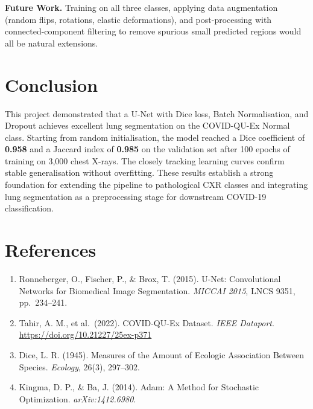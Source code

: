 \documentclass[12pt,a4paper]{article}
\begin{document}
\textbf{Future Work.} Training on all three classes, applying data augmentation
(random flips, rotations, elastic deformations), and post-processing with
connected-component filtering to remove spurious small predicted regions would
all be natural extensions.

\section{Conclusion}

This project demonstrated that a U-Net with Dice loss, Batch Normalisation, and
Dropout achieves excellent lung segmentation on the COVID-QU-Ex Normal class.
Starting from random initialisation, the model reached a Dice coefficient of
\textbf{0.958} and a Jaccard index of \textbf{0.985} on the validation set after
100 epochs of training on 3,000 chest X-rays. The closely tracking learning
curves confirm stable generalisation without overfitting. These results establish
a strong foundation for extending the pipeline to pathological CXR classes and
integrating lung segmentation as a preprocessing stage for downstream COVID-19
classification.

\section*{References}

\begin{enumerate}[noitemsep]
  \item Ronneberger, O., Fischer, P., \& Brox, T. (2015). U-Net: Convolutional
    Networks for Biomedical Image Segmentation. \textit{MICCAI 2015}, LNCS 9351,
    pp.\ 234--241.
  \item Tahir, A. M., et al.\ (2022). COVID-QU-Ex Dataset. \textit{IEEE Dataport}.
    \url{https://doi.org/10.21227/25ex-p371}
  \item Dice, L. R. (1945). Measures of the Amount of Ecologic Association Between
    Species. \textit{Ecology}, 26(3), 297--302.
  \item Kingma, D. P., \& Ba, J. (2014). Adam: A Method for Stochastic
    Optimization. \textit{arXiv:1412.6980}.
\end{enumerate}
\end{document}
